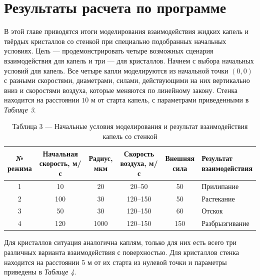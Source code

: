 \chapter{Результаты расчета по программе}

В этой главе приводятся итоги моделирования взаимодействия жидких капель и твёрдых кристаллов со стенкой при специально подобранных начальных условиях. Цель — продемонстрировать четыре возможных сценария взаимодействия для капель и три — для кристаллов. Начнем с выбора начальных условий для капель. Все четыре капли моделируются из начальной точки $(0,0)$ с разными скоростями, диаметрами, силами, действующими на них вертикально вниз и скоростями воздуха, которые меняются по линейному закону. Стенка находится на расстоянии $10$ м от старта капель, с параметрами приведенными в \textit{Таблице 3}.

\begin{table}[H]
	\caption*{Таблица 3 — Начальные условия моделирования и результат взаимодействия капель со стенкой}
	\small
	\centering
	\begin{tabular}{|c|c|c|c|c|l|}
		\hline
		\makecell{\textbf{№}\\\textbf{режима}} 
		& \makecell{\textbf{Начальная}\\\textbf{скорость, м/с}} 
		& \makecell{\textbf{Радиус,}\\\textbf{мкм}} 
		& \makecell{\textbf{Скорость}\\\textbf{воздуха, м/с}} 
		& \makecell{\textbf{Внешняя}\\\textbf{сила}} 
		& \makecell{\textbf{Результат}\\\textbf{взаимодействия}} \\
		\hline
		1 & 10  &   20 & 20--50   &  50 & Прилипание       \\ \hline
		2 & 100 &   30 & 120--150 &  50 & Растекание       \\ \hline
		3 & 50  &   30 & 120--150 &  60 & Отскок           \\ \hline
		4 & 120 & 1000 & 120--150 & 150 & Разбрызгивание   \\ \hline
	\end{tabular}
\end{table}

Для кристаллов ситуация аналогична каплям, только для них есть всего три различных варианта взаимодействия с поверхностью. Для кристаллов стенка находится на расстоянии 5 м от их старта из нулевой точки и параметры приведены в \textit{Таблице 4}.

